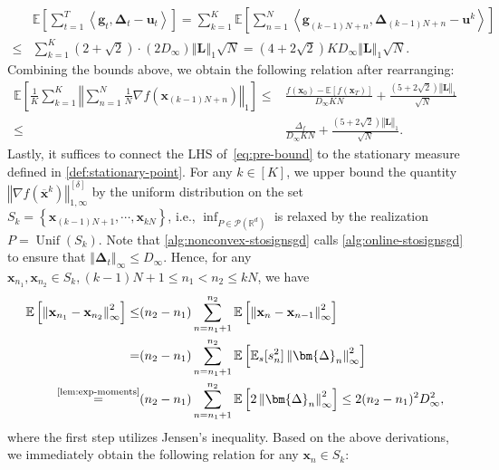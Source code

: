 \documentclass{article}
\def \E {\mathbb{E}}
\def \x {\mathbf{x}}
\def \g {\mathbf{g}}
\def \u {\mathbf{u}}
\def \R {\mathbb{R}}
\def \P {\mathcal{P}}
\def \Lb {\mathbf{L}}
\def \xb {\overline{\x}}
\newcommand{\inner}[2]{\left\langle #1, #2 \right\rangle}
\DeclareMathOperator*{\unif}{Unif}
\newcommand{\norm}[1]{\left\Vert#1\right\Vert}
\def \bDelta {\bm{\Delta}}
\newcommand{\sqbrac}[1]{\left[#1\right]}
\newcommand{\brac}[1]{\left(#1\right)}
\newcommand{\cbrac}[1]{\left\{#1\right\}}
\begin{document}
\begin{equation}\label{eq:bound-regret-T}
    \begin{aligned}
        &\E\sqbrac{\sum_{t=1}^T\inner{\g_t}{\bDelta_t-\u_t}}=\sum_{k=1}^K\E\sqbrac{\sum_{n=1}^N\inner{\g_{(k-1)N+n}}{\bDelta_{(k-1)N+n}-\u^k}}\\\le&\sum_{k=1}^K\brac{2+\sqrt{2}}\cdot(2D_\infty)\norm{\Lb}_1\sqrt{N}=\brac{4+2\sqrt{2}}KD_\infty\norm{\Lb}_1\sqrt{N}.
    \end{aligned}
\end{equation}
Combining the bounds above, we obtain the following relation after rearranging:
\begin{equation}\label{eq:pre-bound}
    \begin{aligned}
        \E\sqbrac{\frac{1}{K}\sum_{k=1}^K\norm{\sum_{n=1}^N\frac{1}{N}\nabla f(\x_{(k-1)N+n})}_1}\le&\frac{f(\x_0)-\E[f(\x_T)]}{D_\infty KN}+\frac{\brac{5+2\sqrt{2}}\norm{\Lb}_1}{\sqrt{N}}\\\le&\frac{\Delta_f}{D_\infty KN}+\frac{\brac{5+2\sqrt{2}}\norm{\Lb}_1}{\sqrt{N}}.
    \end{aligned}
\end{equation}
Lastly, it suffices to connect the LHS of~\eqref{eq:pre-bound} to the stationary measure defined in \cref{def:stationary-point}. For any $k\in[K]$, we upper bound the quantity $\norm{\nabla f(\xb^k)}_{1,\infty}^{[\delta]}$ by the uniform distribution on the set $S_k=\cbrac{\x_{(k-1)N+1},\cdots,\x_{kN}}$, i.e., $\inf_{P\in\P(\R^d)}$ is relaxed by the realization $P=\unif(S_k)$. Note that \cref{alg:nonconvex-stosignsgd} calls \cref{alg:online-stosignsgd} to ensure that $\norm{\bDelta_t}_\infty\le D_\infty$. Hence, for any $\x_{n_1},\x_{n_2}\in S_k, (k-1)N+1\le n_1<n_2\le kN$, we have
\begin{equation}\label{eq:Sk-diam}
    \begin{aligned}
        \E\sqbrac{\norm{\x_{n_1}-\x_{n_2}}_\infty^2}\le&(n_2-n_1)\sum_{n=n_1+1}^{n_2}\E\sqbrac{\norm{\x_n-\x_{n-1}}_\infty^2}\\=&(n_2-n_1)\sum_{n=n_1+1}^{n_2}\E\sqbrac{\E_s[s_n^2]\norm{\bDelta_n}_\infty^2}\\\overset{\text{\cref{lem:exp-moments}}}{=}&(n_2-n_1)\sum_{n=n_1+1}^{n_2}\E\sqbrac{2\norm{\bDelta_n}_\infty^2}\le2(n_2-n_1)^2D_\infty^2,
    \end{aligned}
\end{equation}
where the first step utilizes Jensen's inequality. Based on the above derivations, we immediately obtain the following relation for any $\x_n\in S_k$:
\end{document}
